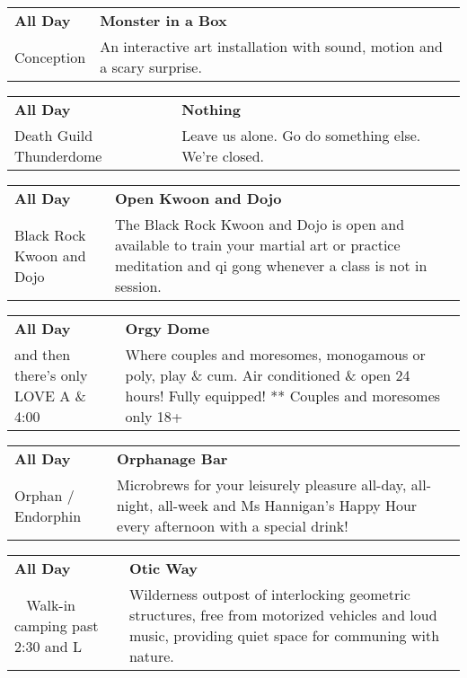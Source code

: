 \begin{tabular}{ p{1in} p{2.2in} }
    \textbf{All Day} & \textbf{Monster in a Box} \\
    Conception \newline  & An interactive art installation with sound, motion and a scary surprise. \\
    \hline 
\end{tabular}
    
\begin{tabular}{ p{1in} p{2.2in} }
    \textbf{All Day} & \textbf{Nothing} \\
    Death Guild Thunderdome \newline  & Leave us alone. Go do something else. We're closed. \\
    \hline 
\end{tabular}
    
\begin{tabular}{ p{1in} p{2.2in} }
    \textbf{All Day} & \textbf{Open Kwoon and Dojo} \\
    Black Rock Kwoon and Dojo \newline  & The Black Rock Kwoon and Dojo is open and available to train your martial art or practice meditation and qi gong whenever a class is not in session. \\
    \hline 
\end{tabular}
    
\begin{tabular}{ p{1in} p{2.2in} }
    \textbf{All Day} & \textbf{Orgy Dome} \\
    and then there's only LOVE \newline A \& 4:00 & Where couples and moresomes, monogamous or poly, play \& cum.  Air conditioned \& open 24 hours! Fully equipped! ** Couples and moresomes only 18+ \\
    \hline 
\end{tabular}
    
\begin{tabular}{ p{1in} p{2.2in} }
    \textbf{All Day} & \textbf{Orphanage Bar} \\
    Orphan / Endorphin \newline  & Microbrews for your leisurely pleasure all-day, all-night, all-week and Ms Hannigan's Happy Hour every afternoon with a special drink! \\
    \hline 
\end{tabular}
    
\begin{tabular}{ p{1in} p{2.2in} }
    \textbf{All Day} & \textbf{Otic Way} \\
    ~ \newline Walk-in camping past 2:30 and L & Wilderness outpost of interlocking geometric structures, free from motorized vehicles and loud music, providing quiet space for communing with nature. \\
    \hline 
\end{tabular}
    
